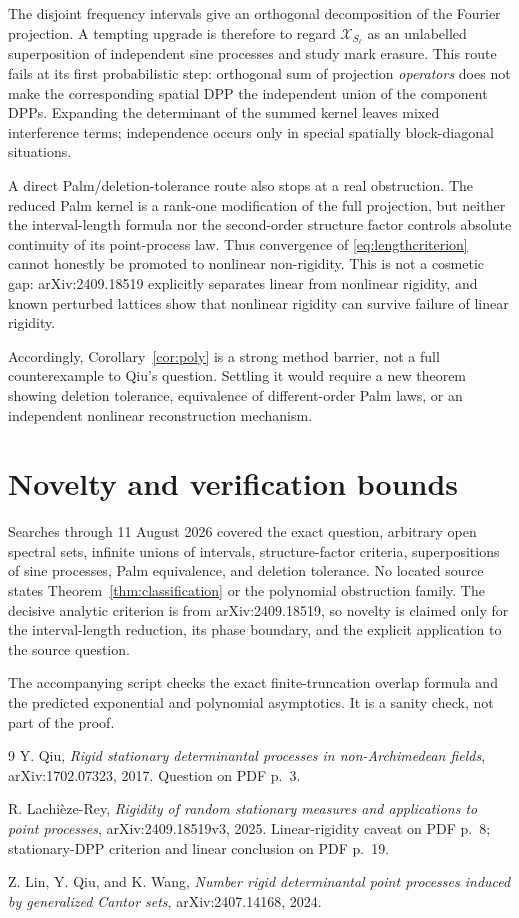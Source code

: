 \documentclass[11pt]{article}
\newcommand{\D}{\mathcal X}
\begin{document}
The disjoint frequency intervals give an orthogonal decomposition of the
Fourier projection.  A tempting upgrade is therefore to regard
$\D_{S_\ell}$ as an unlabelled superposition of independent sine processes
and study mark erasure.  This route fails at its first probabilistic step:
orthogonal sum of projection \emph{operators} does not make the corresponding
spatial DPP the independent union of the component DPPs.  Expanding the
determinant of the summed kernel leaves mixed interference terms; independence
occurs only in special spatially block-diagonal situations.

A direct Palm/deletion-tolerance route also stops at a real obstruction.  The
reduced Palm kernel is a rank-one modification of the full projection, but
neither the interval-length formula nor the second-order structure factor
controls absolute continuity of its point-process law.  Thus convergence of
\eqref{eq:lengthcriterion} cannot honestly be promoted to nonlinear
non-rigidity.  This is not a cosmetic gap: arXiv:2409.18519 explicitly
separates linear from nonlinear rigidity, and known perturbed lattices show
that nonlinear rigidity can survive failure of linear rigidity.

Accordingly, Corollary~\ref{cor:poly} is a strong method barrier, not a full
counterexample to Qiu's question.  Settling it would require a new theorem
showing deletion tolerance, equivalence of different-order Palm laws, or an
independent nonlinear reconstruction mechanism.

\section*{Novelty and verification bounds}

Searches through 11 August 2026 covered the exact question, arbitrary open
spectral sets, infinite unions of intervals, structure-factor criteria,
superpositions of sine processes, Palm equivalence, and deletion tolerance.
No located source states Theorem~\ref{thm:classification} or the polynomial
obstruction family.  The decisive analytic criterion is from
arXiv:2409.18519, so novelty is claimed only for the interval-length reduction,
its phase boundary, and the explicit application to the source question.

The accompanying script checks the exact finite-truncation overlap formula
and the predicted exponential and polynomial asymptotics.  It is a sanity
check, not part of the proof.

\begin{thebibliography}{9}
Y. Qiu, \emph{Rigid stationary determinantal processes in non-Archimedean
fields}, arXiv:1702.07323, 2017.  Question on PDF p.~3.

R. Lachi\`eze-Rey, \emph{Rigidity of random stationary measures and
applications to point processes}, arXiv:2409.18519v3, 2025.  Linear-rigidity
caveat on PDF p.~8; stationary-DPP criterion and linear conclusion on PDF
p.~19.

Z. Lin, Y. Qiu, and K. Wang, \emph{Number rigid determinantal point processes
induced by generalized Cantor sets}, arXiv:2407.14168, 2024.
\end{thebibliography}
\end{document}
